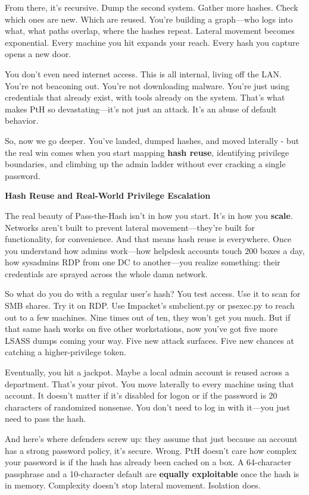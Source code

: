 From there, it’s recursive. Dump the second system. Gather more hashes. Check which ones are new. Which are reused. You’re building a graph—who logs into what, what paths overlap, where the hashes repeat. Lateral movement becomes exponential. Every machine you hit expands your reach. Every hash you capture opens a new door.

You don’t even need internet access. This is all internal, living off the LAN. You’re not beaconing out. You’re not downloading malware. You’re just using credentials that already exist, with tools already on the system. That’s what makes PtH so devastating—it’s not just an attack. It’s an abuse of default behavior.

So, now we go deeper. You’ve landed, dumped hashes, and moved laterally - but the real win comes when you start mapping \textbf{hash reuse}, identifying privilege boundaries, and climbing up the admin ladder without ever cracking a single password.

\textbf{Hash Reuse and Real-World Privilege Escalation}

The real beauty of Pass-the-Hash isn’t in how you start. It’s in how you \textbf{scale}. Networks aren't built to prevent lateral movement—they're built for functionality, for convenience. And that means hash reuse is everywhere. Once you understand how admins work—how helpdesk accounts touch 200 boxes a day, how sysadmins RDP from one DC to another—you realize something: their credentials are sprayed across the whole damn network.

So what do you do with a regular user's hash? You test access. Use it to scan for SMB shares. Try it on RDP. Use Impacket’s smbclient.py or psexec.py to reach out to a few machines. Nine times out of ten, they won’t get you much. But if that same hash works on five other workstations, now you’ve got five more LSASS dumps coming your way. Five new attack surfaces. Five new chances at catching a higher-privilege token.

Eventually, you hit a jackpot. Maybe a local admin account is reused across a department. That’s your pivot. You move laterally to every machine using that account. It doesn’t matter if it's disabled for logon or if the password is 20 characters of randomized nonsense. You don’t need to log in with it—you just need to pass the hash.

And here’s where defenders screw up: they assume that just because an account has a strong password policy, it's secure. Wrong. PtH doesn't care how complex your password is if the hash has already been cached on a box. A 64-character passphrase and a 10-character default are \textbf{equally exploitable} once the hash is in memory. Complexity doesn’t stop lateral movement. Isolation does.

